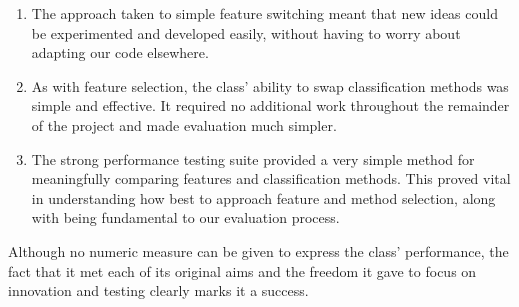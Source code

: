 \begin{enumerate}
	\item The approach taken to simple feature switching meant that new ideas could be experimented and developed easily, without having to worry about adapting our code elsewhere.
	\item As with feature selection, the class' ability to swap classification methods was simple and effective. It required no additional work throughout the remainder of the project and made evaluation much simpler.
	\item The strong performance testing suite provided a very simple method for meaningfully comparing features and classification methods. This proved vital in understanding how best to approach feature and method selection, along with being fundamental to our evaluation process.
\end{enumerate}

Although no numeric measure can be given to express the class' performance, the fact that it met each of its original aims and the freedom it gave to focus on innovation and testing clearly marks it a success.
